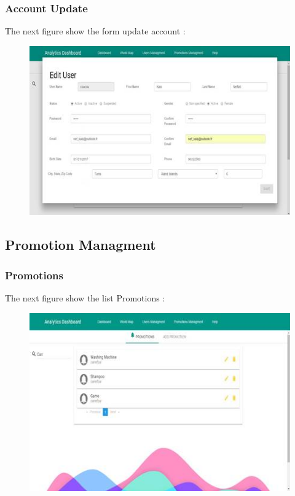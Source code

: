 \subsubsection{Account Update}
\label{sec:sec01}
The next figure show the form update account :
\begin{figure}[h!]
	\centering
	\includegraphics[height=0.3\textheight]{fig01/UserManagementUpdate}
	\label{fig:FilialesEtClients}
\end{figure}
\subsection{Promotion Managment}
\label{sec:sec01}
\subsubsection{Promotions}
\label{sec:sec01}
The next figure show the list Promotions :
\begin{figure}[h!]
	\centering
	\includegraphics[height=0.3\textheight]{fig01/PromotionManagement}
	\label{fig:FilialesEtClients}
\end{figure}
